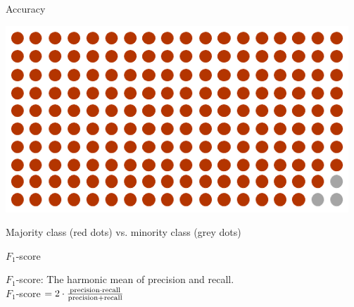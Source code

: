 \documentclass[handout]{beamer}
\begin{document}
\begin{frame}{Accuracy}
	
	\begin{center}
		\includegraphics[width=\linewidth,height=\textheight,keepaspectratio]{../pictures/imbalance.png} 
	\end{center}	
	
	Majority class (red dots) vs. minority class (grey dots) 
	
	
	
\end{frame}



\begin{frame}{\(F_1\)-score}
	
	\(F_1\)-score: The harmonic mean of precision and recall. \\
	
	\(F_1\)-score \(= 2 \cdot \frac{\rm precision \cdot recall}{\rm precision + recall}\)


	
\end{frame}
\end{document}
